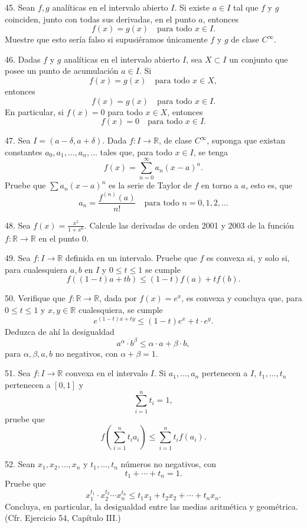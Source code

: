\documentclass[12pt,oneside]{book}
\begin{document}
45. Sean \( f, g \) analíticas en el intervalo abierto \( I \). Si existe \( a \in I \) tal que \( f \) y \( g \) coinciden, junto con todas sus derivadas, en el punto \( a \), entonces
\[
f(x) = g(x) \quad \text{para todo } x \in I.
\]
Muestre que esto sería falso si supusiéramos únicamente \( f \) y \( g \) de clase \( C^\infty \).

46. Dadas \( f \) y \( g \) analíticas en el intervalo abierto \( I \), sea \( X \subset I \) un conjunto que posee un punto de acumulación \( a \in I \). Si
\[
f(x) = g(x) \quad \text{para todo } x \in X,
\]
entonces
\[
f(x) = g(x) \quad \text{para todo } x \in I.
\]
En particular, si \( f(x) = 0 \) para todo \( x \in X \), entonces
\[
f(x) = 0 \quad \text{para todo } x \in I.
\]

47. Sea \( I = (a - \delta, a + \delta) \). Dada \( f: I \to \mathbb{R} \), de clase \( C^\infty \), suponga que existan constantes \( a_0, a_1, \ldots, a_n, \ldots \) tales que, para todo \( x \in I \), se tenga
\[
f(x) = \sum_{n=0}^\infty a_n (x - a)^n.
\]
Pruebe que \( \sum a_n (x - a)^n \) es la serie de Taylor de \( f \) en torno a \( a \), esto es, que
\[
a_n = \frac{f^{(n)}(a)}{n!} \quad \text{para todo } n = 0, 1, 2, \ldots
\]

48. Sea \( f(x) = \frac{x^5}{1 + x^6} \). Calcule las derivadas de orden 2001 y 2003 de la función \( f: \mathbb{R} \to \mathbb{R} \) en el punto \( 0 \).

49. Sea \( f: I \to \mathbb{R} \) definida en un intervalo. Pruebe que \( f \) es convexa si, y solo si, para cualesquiera \( a, b \) en \( I \) y \( 0 \leq t \leq 1 \) se cumple
\[
f((1-t)a + tb) \leq (1-t)f(a) + t f(b).
\]

50. Verifique que \( f: \mathbb{R} \to \mathbb{R} \), dada por \( f(x) = e^x \), es convexa y concluya que, para \( 0 \leq t \leq 1 \) y \( x, y \in \mathbb{R} \) cualesquiera, se cumple
\[
e^{(1-t)x + ty} \leq (1-t)e^x + t \cdot e^y.
\]
Deduzca de ahí la desigualdad
\[
a^\alpha \cdot b^\beta \leq \alpha \cdot a + \beta \cdot b,
\]
para \( \alpha, \beta, a, b \) no negativos, con \( \alpha + \beta = 1 \).

51. Sea \( f: I \to \mathbb{R} \) convexa en el intervalo \( I \). Si \( a_1, \ldots, a_n \) pertenecen a \( I \), \( t_1, \ldots, t_n \) pertenecen a \( [0, 1] \) y
\[
\sum_{i=1}^n t_i = 1,
\]
pruebe que
\[
f\left( \sum_{i=1}^n t_i a_i \right) \leq \sum_{i=1}^n t_i f(a_i).
\]

52. Sean \( x_1, x_2, \ldots, x_n \) y \( t_1, \ldots, t_n \) números no negativos, con
\[
t_1 + \cdots + t_n = 1.
\]
Pruebe que
\[
x_1^{t_1} \cdot x_2^{t_2} \cdots x_n^{t_n} \leq t_1 x_1 + t_2 x_2 + \cdots + t_n x_n.
\]
Concluya, en particular, la desigualdad entre las medias aritmética y geométrica. (Cfr. Ejercicio 54, Capítulo III.)
\end{document}
